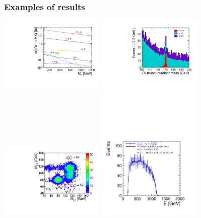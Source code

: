 \documentclass{beamer}
\begin{document}
\begin{frame}
\frametitle{Examples of results}
\begin{center}
\includegraphics[width=5cm]{xsec_vs_Hmass_sqrts3000}
\includegraphics[width=5cm]{ee_h_mumu_mass_mh120GeV}\\
\includegraphics[width=5cm]{MassPlot2D}
\includegraphics[width=5cm]{205_H1LPADC4}
\end{center}

\end{frame}
\end{document}

